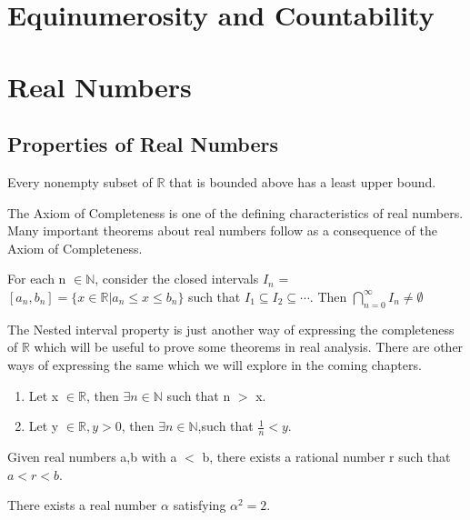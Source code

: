 \documentclass{report}
\begin{document}
\chapter{Equinumerosity and Countability}

\chapter{Real Numbers}
\section{Properties of Real Numbers}
\begin{axiom}
Every nonempty subset of $\mathbb{R}$ that is bounded above has a least upper bound.
\end{axiom}
The Axiom of Completeness is one of the defining characteristics of real numbers. Many important theorems about real numbers follow as a consequence of the Axiom of Completeness.

\begin{theorem}
For each n $\in \mathbb{N}$, consider the closed intervals $I_n$ = $\left[a_n,b_n\right] = \{ x \in \mathbb{R}  \vert  a_n \leq x \leq b_n\}$ such that $I_1 \subseteq I_2 \subseteq \cdots$. Then $\bigcap^\infty_{n=0}I_n \neq \emptyset$
\end{theorem}
The Nested interval property is just another way of expressing the completeness of $\mathbb{R}$ which will be useful to prove some theorems in real analysis. There are other ways of expressing the same which we will explore in the coming chapters.

\begin{theorem}
\begin{enumerate}
\item Let x $\in \mathbb{R}$, then $\exists n \in \mathbb{N}$ such that n $>$ x.
\item Let y $\in \mathbb{R}, y > 0$, then $\exists n \in \mathbb{N}$,such that $\frac{1}{n} < y$.
\end{enumerate}
\end{theorem}

\begin{theorem}
Given real numbers a,b with a $<$ b, there exists a rational number r such that $a < r < b$.
\end{theorem}

\begin{theorem}
There exists a real number $\alpha$ satisfying $\alpha^2 = 2$.
\end{theorem}
\end{document}
